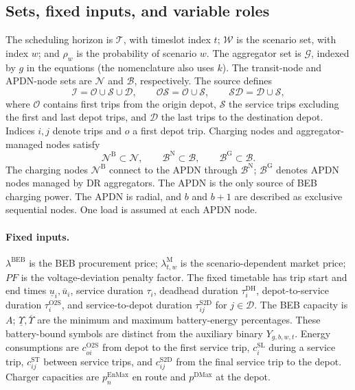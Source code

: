 \documentclass{article}
\begin{document}
\subsection*{Sets, fixed inputs, and variable roles}
The scheduling horizon is \(\mathcal T\), with timeslot index \(t\); \(\mathcal W\) is the scenario set, with index \(w\); and \(\rho_w\) is the probability of scenario \(w\). The aggregator set is \(\mathcal G\), indexed by \(g\) in the equations (the nomenclature also uses \(k\)). The transit-node and APDN-node sets are \(\mathcal N\) and \(\mathcal B\), respectively. The source defines
\[
\mathcal I=\mathcal O\cup\mathcal S\cup\mathcal D,
\qquad\mathcal{OS}=\mathcal O\cup\mathcal S,
\qquad\mathcal{SD}=\mathcal D\cup\mathcal S,
\]
where \(\mathcal O\) contains first trips from the origin depot, \(\mathcal S\) the service trips excluding the first and last depot trips, and \(\mathcal D\) the last trips to the destination depot. Indices \(i,j\) denote trips and \(o\) a first depot trip. Charging nodes and aggregator-managed nodes satisfy
\[
\mathcal N^{\mathrm B}\subset\mathcal N,
\qquad\mathcal B^{\mathrm N}\subset\mathcal B,
\qquad\mathcal B^{\mathrm G}\subset\mathcal B.
\]
The charging nodes \(\mathcal N^{\mathrm B}\) connect to the APDN through \(\mathcal B^{\mathrm N}\); \(\mathcal B^{\mathrm G}\) denotes APDN nodes managed by DR aggregators. The APDN is the only source of BEB charging power. The APDN is radial, and \(b\) and \(b+1\) are described as exclusive sequential nodes. One load is assumed at each APDN node.

\paragraph{Fixed inputs.}
\(\lambda^{\mathrm{BEB}}\) is the BEB procurement price; \(\lambda^{\mathrm M}_{t,w}\) is the scenario-dependent market price; \(PF\) is the voltage-deviation penalty factor. The fixed timetable has trip start and end times \(\underline u_i,\overline u_i\), service duration \(\tau_i\), deadhead duration \(\tau_i^{\mathrm{DH}}\), depot-to-service duration \(\tau_i^{\mathrm{O2S}}\), and service-to-depot duration \(\tau_{ij}^{\mathrm{S2D}}\) for \(j\in\mathcal D\). The BEB capacity is \(A\); \(\underline\Upsilon,\overline\Upsilon\) are the minimum and maximum battery-energy percentages. These battery-bound symbols are distinct from the auxiliary binary \(Y_{g,b,w,t}\). Energy consumptions are \(c^{\mathrm{O2S}}_{oi}\) from depot to the first service trip, \(c_i^{\mathrm{SL}}\) during a service trip, \(c^{\mathrm{ST}}_{ij}\) between service trips, and \(c^{\mathrm{S2D}}_{ij}\) from the final service trip to the depot. Charger capacities are \(p_n^{\mathrm{EnMax}}\) en route and \(p^{\mathrm{DMax}}\) at the depot.
\end{document}
